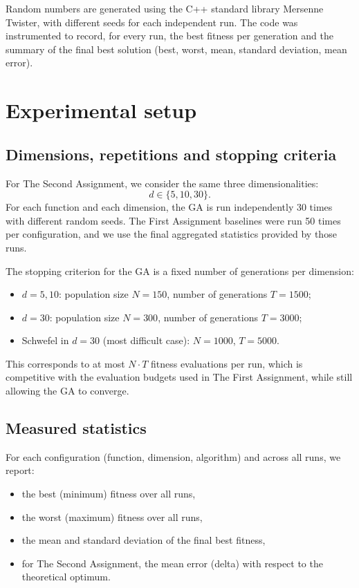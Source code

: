 \documentclass[a4paper,11pt]{article}
\begin{document}
Random numbers are generated using the C++ standard library Mersenne Twister,
with different seeds for each independent run. The code was instrumented to
record, for every run, the best fitness per generation and the summary of the
final best solution (best, worst, mean, standard deviation, mean error).

\section{Experimental setup}
\label{sec:setup}

\subsection{Dimensions, repetitions and stopping criteria}

For The Second Assignment, we consider the same three dimensionalities:
\[
  d \in \{5,10,30\}.
\]
For each function and each dimension, the GA is run independently 30 times
with different random seeds. The First Assignment baselines were run 50 times per configuration,
and we use the final aggregated statistics provided by those runs.

The stopping criterion for the GA is a fixed number of generations per dimension:
\begin{itemize}
  \item $d = 5,10$: population size $N = 150$, number of generations $T = 1500$;
  \item $d = 30$: population size $N = 300$, number of generations $T = 3000$;
  \item Schwefel in $d=30$ (most difficult case): $N = 1000$, $T = 5000$.
\end{itemize}
This corresponds to at most $N \cdot T$ fitness evaluations per run, which is
competitive with the evaluation budgets used in The First Assignment, while still allowing
the GA to converge.

\subsection{Measured statistics}

For each configuration (function, dimension, algorithm) and across all runs, we
report:
\begin{itemize}
  \item the best (minimum) fitness over all runs,
  \item the worst (maximum) fitness over all runs,
  \item the mean and standard deviation of the final best fitness,
  \item for The Second Assignment, the mean error (delta) with respect to the theoretical optimum.
\end{itemize}
\end{document}
